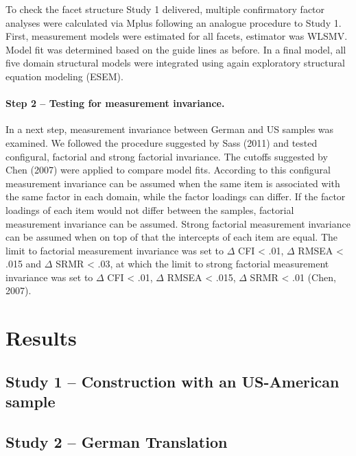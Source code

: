 \documentclass[man]{apa6}
\theoremstyle{definition}
\theoremstyle{definition}
\theoremstyle{definition}
\theoremstyle{remark}
\begin{document}
To check the facet structure Study 1 delivered, multiple confirmatory
factor analyses were calculated via Mplus following an analogue
procedure to Study 1. First, measurement models were estimated for all
facets, estimator was WLSMV. Model fit was determined based on the guide
lines as before. In a final model, all five domain structural models
were integrated using again exploratory structural equation modeling
(ESEM).

\hypertarget{step-2-testing-for-measurement-invariance.}{%
\paragraph{Step 2 -- Testing for measurement
invariance.}\label{step-2-testing-for-measurement-invariance.}}

In a next step, measurement invariance between German and US samples was
examined. We followed the procedure suggested by Sass (2011) and tested
configural, factorial and strong factorial invariance. The cutoffs
suggested by Chen (2007) were applied to compare model fits. According
to this configural measurement invariance can be assumed when the same
item is associated with the same factor in each domain, while the factor
loadings can differ. If the factor loadings of each item would not
differ between the samples, factorial measurement invariance can be
assumed. Strong factorial measurement invariance can be assumed when on
top of that the intercepts of each item are equal. The limit to
factorial measurement invariance was set to \(\Delta\) CFI \textless{}
.01, \(\Delta\) RMSEA \textless{} .015 and \(\Delta\) SRMR \textless{}
.03, at which the limit to strong factorial measurement invariance was
set to \(\Delta\) CFI \textless{} .01, \(\Delta\) RMSEA \textless{}
.015, \(\Delta\) SRMR \textless{} .01 (Chen, 2007).

\hypertarget{results-1}{%
\section{Results}\label{results-1}}

\hypertarget{study-1-construction-with-an-us-american-sample}{%
\subsection{Study 1 -- Construction with an US-American
sample}\label{study-1-construction-with-an-us-american-sample}}

\hypertarget{study-2-german-translation-1}{%
\subsection{Study 2 -- German
Translation}\label{study-2-german-translation-1}}
\end{document}

